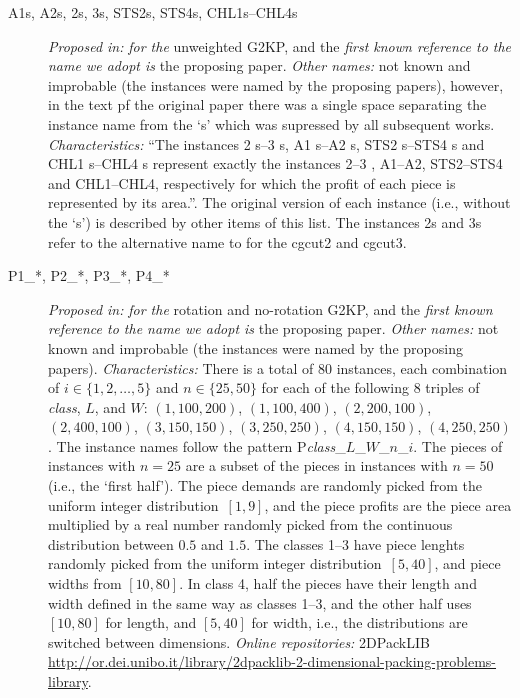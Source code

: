 \documentclass[ppgc,prop-tese,english,formais,babel]{iiufrgs}
\begin{document}
\begin{description}
\item [A1s, A2s, 2s, 3s, STS2s, STS4s, CHL1s--CHL4s] \emph{Proposed in:} \citet{cung:2000} \emph{for the} unweighted G2KP, and the \emph{first known reference to the name we adopt is} the proposing paper. \emph{Other names:} not known and improbable (the instances were named by the proposing papers), however, in the text pf the original paper there was a single space separating the instance name from the `s' which was supressed by all subsequent works. \emph{Characteristics: } ``The instances 2 s--3 s, A1 s--A2 s, STS2 s--STS4 s and CHL1 s--CHL4 s represent exactly the instances 2--3 , A1--A2, STS2--STS4 and CHL1--CHL4, respectively for which the profit of each piece is represented by its area.''. \citep{cung:2000} The original version of each instance (i.e., without the `s') is described by other items of this list. The instances 2s and 3s refer to the alternative name to for the cgcut2 and cgcut3.
\item [P1\_*, P2\_*, P3\_*, P4\_*] \emph{Proposed in:} \citet{velasco:2019} \emph{for the} rotation and no-rotation G2KP, and the \emph{first known reference to the name we adopt is} the proposing paper. \emph{Other names:} not known and improbable (the instances were named by the proposing papers). \emph{Characteristics: } There is a total of 80 instances, each combination of \(i \in \{1, 2, \dots, 5\}\) and \(n \in \{25, 50\}\) for each of the following 8 triples of \emph{class}, \(L\), and \(W\): \((1, 100, 200)\), \((1, 100, 400)\), \((2, 200, 100)\), \((2, 400, 100)\), \((3, 150, 150)\), \((3, 250, 250)\), \((4, 150, 150)\), \((4, 250, 250)\). The instance names follow the pattern P\emph{class}\_\(L\)\_\(W\)\_\(n\)\_\(i\). The pieces of instances with \(n = 25\) are a subset of the pieces in instances with \(n = 50\) (i.e., the `first half'). The piece demands are randomly picked from the uniform integer distribution~\([1, 9]\), and the piece profits are the piece area multiplied by a real number randomly picked from the continuous distribution between \(0.5\) and \(1.5\). The classes 1--3 have piece lenghts randomly picked from the uniform integer distribution~\([5, 40]\), and piece widths from \([10, 80]\). In class 4, half the pieces have their length and width defined in the same way as classes 1--3, and the other half uses \([10, 80]\) for length, and \([5, 40]\) for width, i.e., the distributions are switched between dimensions. \emph{Online repositories:} 2DPackLIB \url{http://or.dei.unibo.it/library/2dpacklib-2-dimensional-packing-problems-library}.

\end{description}
\end{document}
